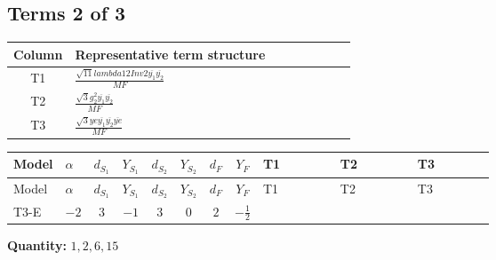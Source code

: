 \documentclass[8pt]{article}
\begin{document}
\begin{landscape}
\subsection*{Terms 2 of 3}
\begin{center}
\begin{tabular}{@{}c >{\raggedright\arraybackslash}p{0.82\linewidth}@{}}
\toprule
Column & Representative term structure \\
\midrule
T1 & \(\displaystyle \frac{\sqrt{11} lambda12Inv2 \overline{y_{1}} \overline{y_{2}}}{MF}\) \\
\midrule
T2 & \(\displaystyle \frac{\sqrt{3} g_{2}^{2} \overline{y_{1}} \overline{y_{2}}}{MF}\) \\
\midrule
T3 & \(\displaystyle \frac{\sqrt{3} ye \overline{y_{1}} \overline{y_{2}} \overline{ye}}{MF}\) \\
\midrule
\bottomrule
\end{tabular}
\end{center}
\smallskip
\tiny
\begin{longtable}{@{}llcccccc >{\raggedright\arraybackslash}p{0.21\linewidth} >{\raggedright\arraybackslash}p{0.21\linewidth} >{\raggedright\arraybackslash}p{0.21\linewidth}@{}}
\toprule
Model & $\alpha$ & $d_{S_1}$ & $Y_{S_1}$ & $d_{S_2}$ & $Y_{S_2}$ & $d_F$ & $Y_F$ & T1 & T2 & T3 \\
\midrule
\endfirsthead
\toprule
Model & $\alpha$ & $d_{S_1}$ & $Y_{S_1}$ & $d_{S_2}$ & $Y_{S_2}$ & $d_F$ & $Y_F$ & T1 & T2 & T3 \\
\midrule
\endhead
T3-E & $-2$ & $3$ & $-1$ & $3$ & $0$ & $2$ & $-\frac{1}{2}$ & \scriptsize\adjustbox{max width=\linewidth}{$\begin{gathered} \frac{3 \sqrt{11} lambda12Inv2 \overline{y_{1}} \overline{y_{2}}}{22 MF}\end{gathered}$} & \scriptsize\adjustbox{max width=\linewidth}{$\begin{gathered} \frac{15 \sqrt{3} g_{2}^{2} \overline{y_{1}} \overline{y_{2}}}{8 MF}\end{gathered}$} & \scriptsize\adjustbox{max width=\linewidth}{$\begin{gathered} - \frac{\sqrt{3} ye \overline{y_{1}} \overline{y_{2}} \overline{ye}}{12 MF}\end{gathered}$} \\
\midrule
\bottomrule
\end{longtable}
\clearpage
\noindent\textbf{Quantity: }$\mathrm{1,2,6,15}$\par\smallskip

\end{landscape}
\end{document}

